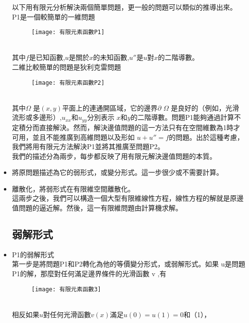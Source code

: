 \begin{itemize}
\qquad 以下用有限元分析解決兩個簡單問題，更一般的問題可以類似的推導出來。\\
\qquad P1是一個較簡單的一維問題 \\
\begin{figure}[hbt!]
\begin{center}
\texttt{[image: 有限元素函數P1]}
\end{center}
\end{figure}
\\
\qquad 其中$ f$是已知函數,$ u$是關於$ x$的未知函數,$ u ″$是$ u$對$ x$的二階導數。\\
二維比較簡單的問題是狄利克雷問題 \\
\begin{figure}[hbt!]
\begin{center}
\texttt{[image: 有限元素函數P2]}
\end{center}
\end{figure}
\\
\qquad 其中$\Omega$ 是$ (x,y)$平面上的連通開區域，它的邊界$ \partial $ $\Omega$ 是良好的（例如，光滑流形或多邊形）,$ u_{{xx}}$和$ u_{{yy}}$分別表示 $ x$和$ y$的二階導數。問題P1能夠通過計算不定積分而直接解決。然而，解決邊值問題的這一方法只有在空間維數為1時才可用，並且不能推廣到高維問題以及形如 $u+u''=f$的問題。出於這種考慮，我們將用有限元方法解決P1並將其推廣至問題P2。\\ 

\qquad 我們的描述分為兩步，每步都反映了用有限元解決邊值問題的本質。 \\
\item 將原問題描述為它的弱形式，或變分形式。這一步很少或不需要計算。\\
\item 離散化，將弱形式在有限維空間離散化。\\

\qquad 這兩步之後，我們可以構造一個大型有限維線性方程，線性方程的解就是原邊值問題的逼近解。然後，這一有限維問題由計算機求解。 \\

\subsection{弱解形式}
\item P1的弱解形式\\
\qquad 第一步是將問題P1和P2轉化為他的等價變分形式，或弱解形式。如果 u是問題P1的解，那麼對任何滿足邊界條件的光滑函數 v ,有 \\
\begin{figure}[hbt!]
\begin{center}
\texttt{[image: 有限元素函數3]}
\end{center}
\end{figure}
\\
\qquad 相反如果$ u$對任何光滑函數$ v(x)$滿足$ u(0)=u(1)=0$和（1），\\


\end{itemize}
